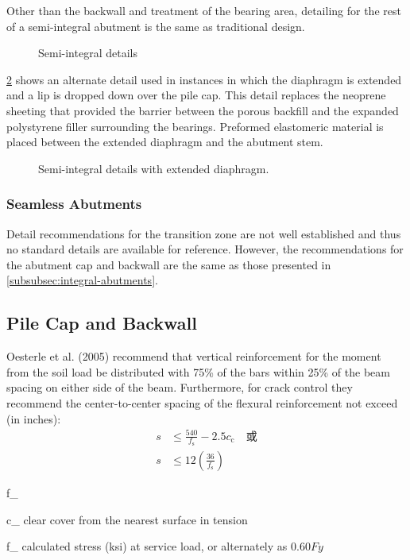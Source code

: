Other than the backwall and treatment of the bearing area, detailing for the rest of a semi-integral abutment is the same as traditional design.

\begin{figure}
  \caption{Semi-integral details}
  \label{fig:semi-integral-details}
\end{figure}

\cref{fig:semi-integral-details-extended-diaphragm} shows an alternate detail used in instances in which the diaphragm is extended and a lip is dropped
down over the pile cap. This detail replaces the neoprene sheeting that provided the barrier between the porous
backfill and the expanded polystyrene filler surrounding the bearings. Preformed elastomeric material is placed
between the extended diaphragm and the abutment stem.

\begin{figure}
  \caption{Semi-integral details with extended diaphragm.}
  \label{fig:semi-integral-details-extended-diaphragm}
\end{figure}



\subsubsection{Seamless Abutments}
Detail recommendations for the transition zone are not well established and thus no standard details are available for reference. However, the recommendations for the abutment cap and backwall are the same as those presented in \cref{subsubsec:integral-abutments}.

\subsection{Pile Cap and Backwall}
Oesterle et al. (2005) recommend that vertical reinforcement for the moment from the soil load be distributed
with 75\% of the bars within 25\% of the beam spacing on either side of the beam. Furthermore, for crack control they
recommend the center-to-center spacing of the flexural reinforcement not exceed (in inches):
\begin{align}
  s &\leqslant \frac{540}{f_\text{s}}-2.5c_\text{c} \quad \text{或}\\
  s &\leqslant 12 \left(\frac{36}{f_\text{s}}\right)
\end{align}
\begin{EqDesc}{f_}
  \item[c_\text{c}] clear cover from the nearest surface in tension
  \item[f_\text{s}] calculated stress (ksi) at service load, or alternately as $0.60Fy$
\end{EqDesc}

